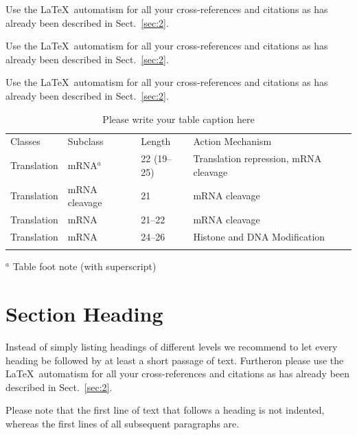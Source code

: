  Use the \LaTeX\ automatism for all your cross-references and citations as has already been described in Sect.~\ref{sec:2}.

 Use the \LaTeX\ automatism for all your cross-refer\-ences and citations as has already been described in Sect.~\ref{sec:2}.

 Use the \LaTeX\ automatism for all your cross-refer\-ences and citations as has already been described in Sect.~\ref{sec:2}.
%
%
\begin{table}[!t]
\caption{Please write your table caption here}
\label{tab:1}       %
%
%
\begin{tabular}{p{2cm}p{2.4cm}p{2cm}p{4.9cm}}
\hline\noalign{\smallskip}
Classes & Subclass & Length & Action Mechanism  \\
\noalign{\smallskip}\svhline\noalign{\smallskip}
Translation & mRNA$^a$  & 22 (19--25) & Translation repression, mRNA cleavage\\
Translation & mRNA cleavage & 21 & mRNA cleavage\\
Translation & mRNA  & 21--22 & mRNA cleavage\\
Translation & mRNA  & 24--26 & Histone and DNA Modification\\
\noalign{\smallskip}\hline\noalign{\smallskip}
\end{tabular}

$^a$ Table foot note (with superscript)
\end{table}
%
\section{Section Heading}
\label{sec:3}
Instead of simply listing headings of different levels we recommend to let every heading be followed by at least a short passage of text. Furtheron please use the \LaTeX\ automatism for all your cross-references and citations as has already been described in Sect.~\ref{sec:2}.

Please note that the first line of text that follows a heading is not indented, whereas the first lines of all subsequent paragraphs are.

